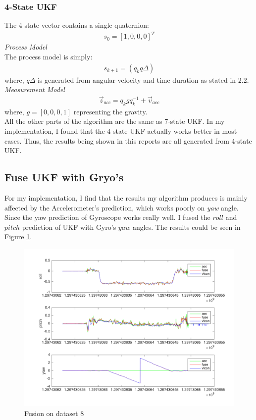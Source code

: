 \documentclass[english]{article}
\begin{document}
\subsubsection{4-State UKF}
The 4-state vector contains a single quaternion:
\begin{align}
s_0 = [1, 0, 0, 0]^T
\end{align}
\emph{Process Model} \\
The process model is simply:
\begin{align}
s_{k+1} = (q_k q\Delta )
\end{align}
where, $q\Delta$ is generated from angular velocity and time duration as stated in 2.2.\\
\emph{Measurement Model} \\
\begin{align}
\vec z_{acc} = q_k g q_k^{-1} + \vec v_{acc}
\end{align}
where, $g = [0,0,0,1]$ representing the gravity.\\
All the other parts of the algorithm are the same as 7-state UKF. In my implementation, I found that the 4-state UKF actually works better in most cases. Thus, the results being shown in this reports are all generated from 4-state UKF.

\subsection {Fuse UKF with Gryo's}
For my implementation, I find that the results my algorithm produces is mainly affected by the Accelerometer's prediction, which works poorly on \emph{yaw} angle. Since the yaw prediction of Gyroscope works really well. I fused the $roll$ and $pitch$ prediction of UKF with Gyro's $yaw$ angles. The results could be seen in Figure \ref{fig:fuse_8}.


\begin{figure}
\centering
\includegraphics[scale=0.5]{images/Fuse_100.png} 
\caption{Fusion on dataset 8}
\label{fig:fuse_8}
\end{figure}
\end{document}
